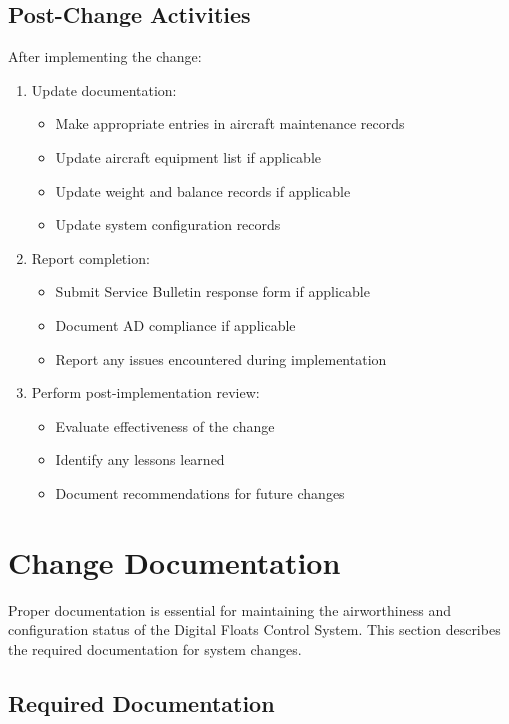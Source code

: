 \documentclass[12pt,a4paper,twoside,openright]{book}
\begin{document}
\subsection{Post-Change Activities}

After implementing the change:

\begin{enumerate}
    \item Update documentation:
    \begin{itemize}
        \item Make appropriate entries in aircraft maintenance records
        \item Update aircraft equipment list if applicable
        \item Update weight and balance records if applicable
        \item Update system configuration records
    \end{itemize}
    
    \item Report completion:
    \begin{itemize}
        \item Submit Service Bulletin response form if applicable
        \item Document AD compliance if applicable
        \item Report any issues encountered during implementation
    \end{itemize}
    
    \item Perform post-implementation review:
    \begin{itemize}
        \item Evaluate effectiveness of the change
        \item Identify any lessons learned
        \item Document recommendations for future changes
    \end{itemize}
\end{enumerate}

\section{Change Documentation}

Proper documentation is essential for maintaining the airworthiness and configuration status of the Digital Floats Control System. This section describes the required documentation for system changes.

\subsection{Required Documentation}
\end{document}
